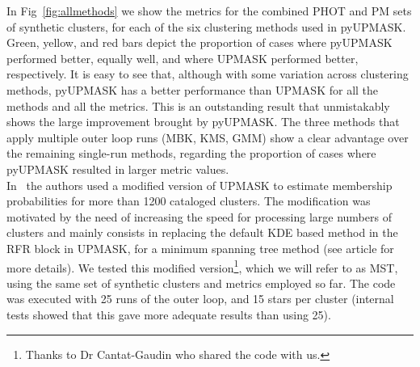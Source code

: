 \documentclass{aa}
\begin{document}
 In Fig~\ref{fig:allmethods} we show the metrics for the combined PHOT and PM
 sets of synthetic clusters, for each of the six clustering methods used in
 pyUPMASK. Green, yellow, and red bars depict the proportion of cases where
 pyUPMASK performed better, equally well, and where UPMASK performed
 better, respectively.
 It is easy to see that, although with some variation across clustering methods,
 pyUPMASK has a better performance than UPMASK for all the methods and all the
 metrics.
 This is an outstanding result that unmistakably shows the large improvement
 brought by pyUPMASK.
 The three methods that apply multiple outer loop runs (MBK, KMS, GMM) show a
 clear advantage over the remaining single-run methods, regarding the
 proportion of cases where pyUPMASK resulted in larger metric values.\\

 In~\cite{Cantat_2018} the authors used a modified version of UPMASK to
 estimate membership probabilities for more than 1200 cataloged clusters. The
 modification was motivated by the need of increasing the speed for processing
 large numbers of clusters and mainly consists in replacing the default KDE
 based method in the RFR block in UPMASK, for a minimum spanning tree method 
 (see article for more details).
 We tested this modified version\footnote{Thanks to Dr Cantat-Gaudin
 who shared the code with us.}, which we will refer to as MST, using the same
 set of synthetic clusters and metrics employed so far. The code was executed
 with 25 runs of the outer loop, and 15 stars per cluster (internal tests
 showed that this gave more adequate results than using 25).\\
\end{document}
